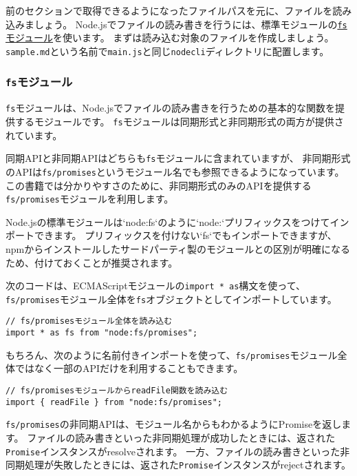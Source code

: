 前のセクションで取得できるようになったファイルパスを元に、ファイルを読み込みましょう。
Node.jsでファイルの読み書きを行うには、標準モジュールの\href{https://nodejs.org/api/fs.html}{\texttt{fs}モジュール}を使います。
まずは読み込む対象のファイルを作成しましょう。\texttt{sample.md}という名前で\texttt{main.js}と同じ\texttt{nodecli}ディレクトリに配置します。



\hypertarget{fs-module}{%
\subsubsection{\texorpdfstring{\texttt{fs}モジュール}{fsモジュール}}\label{fs-module}}

\texttt{fs}モジュールは、Node.jsでファイルの読み書きを行うための基本的な関数を提供するモジュールです。
\texttt{fs}モジュールは同期形式と非同期形式の両方が提供されています。

同期APIと非同期APIはどちらも\texttt{fs}モジュールに含まれていますが、
非同期形式のAPIは\texttt{fs/promises}というモジュール名でも参照できるようになっています。
この書籍では分かりやすさのために、非同期形式のみのAPIを提供する\texttt{fs/promises}モジュールを利用します。

Node.jsの標準モジュールは`node:fs`のように`node:`プリフィックスをつけてインポートできます。
プリフィックスを付けない`fs`でもインポートできますが、npmからインストールしたサードパーティ製のモジュールとの区別が明確になるため、付けておくことが推奨されます。

次のコードは、ECMAScriptモジュールの\texttt{import * as}構文を使って、\texttt{fs/promises}モジュール全体を\texttt{fs}オブジェクトとしてインポートしています。

\begin{lstlisting}
// fs/promisesモジュール全体を読み込む
import * as fs from "node:fs/promises";
\end{lstlisting}

もちろん、次のように名前付きインポートを使って、\texttt{fs/promises}モジュール全体ではなく一部のAPIだけを利用することもできます。

\begin{lstlisting}
// fs/promisesモジュールからreadFile関数を読み込む
import { readFile } from "node:fs/promises";
\end{lstlisting}

\texttt{fs/promises}の非同期APIは、モジュール名からもわかるようにPromiseを返します。
ファイルの読み書きといった非同期処理が成功したときには、返された\texttt{Promise}インスタンスがresolveされます。
一方、ファイルの読み書きといった非同期処理が失敗したときには、返された\texttt{Promise}インスタンスがrejectされます。

